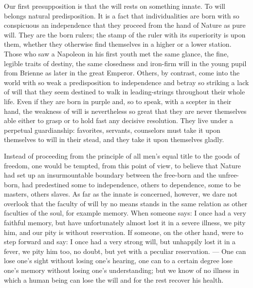 \documentclass[12pt,a4paper,openany]{book}
\newcommand{\opage}[1]{\marginnote{\footnotesize\textit{[#1]}}}
\begin{document}
Our first presupposition is that the will rests on
something innate. To will belongs natural predisposition. It
is a fact that individualities are born with so
conspicuous an independence that they proceed from the hand of Nature
as pure will. %
They are the born rulers; the stamp of the ruler
with its superiority is upon them, whether they
otherwise find themselves in a higher or a lower station. Those
who saw a Napoleon in his first youth met the
same glance, the fine, legible traits of destiny, the same closedness
and iron-firm will in the young pupil from Brienne as
later in the great Emperor. Others, by contrast, come into the world
with so weak a predisposition to independence and betray so
striking a lack of will that they seem destined to walk
in leading-strings throughout their whole life. Even if they are born in
purple and, so to speak, with a scepter in their hand, the
weakness of will is nevertheless so great that they are never themselves able
either to grasp or to hold fast any decisive resolution.
They live under a perpetual guardianship: favorites,
servants, counselors must take it upon themselves to will in their stead,
and they take it upon themselves gladly.

Instead of proceeding from the principle of all
men's equal title to the goods of freedom, one would be tempted,
from this point of view, to believe that Nature had
set up an insurmountable boundary between the free-born and the
unfree-born, had predestined some to independence,
others to dependence, some to be masters, others slaves.
As far as the innate is concerned, however, we dare not overlook
that the faculty of will by no means stands in the same relation as
other faculties of the soul, for example memory. When someone says: I
once had a very faithful memory, but have unfortunately
almost lost it in a severe illness, we pity him,
and our pity is without reservation. If someone, on the other hand,
\setcounter{footnote}{0}%
\opage{3}were to step forward and say: I once had a very strong
will, but unhappily lost it in a fever, we pity
him too, no doubt, but yet with a peculiar reservation. --- One
can lose one's sight without losing one's hearing, one can to a
certain degree lose one's memory without losing one's understanding;
but we know of no illness in which a human being can lose
the will and for the rest recover his health.
\end{document}
